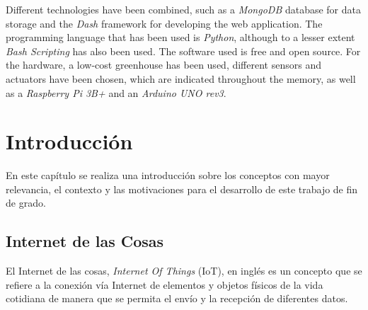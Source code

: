 \documentclass[a4paper, 12pt, oneside]{book}
\begin{document}
Different technologies have been combined, such as a \textit{MongoDB} database for data storage and the \textit{Dash} framework for developing the web application.
The programming language that has been used is \textit{Python}, although to a lesser extent \textit{Bash Scripting} has also been used. The software used is free and open source. For the hardware, a low-cost greenhouse has been used, different sensors and actuators have been chosen, which are indicated throughout the memory, as well as a \textit{Raspberry Pi 3B+} and an \textit{Arduino UNO rev3}.



\tableofcontents 
\cleardoublepage
\listoffigures %



\cleardoublepage
\chapter{Introducción}
\label{chap:intro} %

En este capítulo se realiza una introducción sobre los conceptos con mayor relevancia, el contexto y las motivaciones para el desarrollo de este trabajo de fin de grado.

\section{Internet de las Cosas}
\label{sec:Internet de las Cosas}
El Internet de las cosas, \textit{Internet Of Things} (IoT), en inglés es un concepto que se refiere a la conexión vía Internet de elementos y objetos físicos de la vida cotidiana de manera que se permita el envío y la recepción de diferentes datos.
\end{document}
